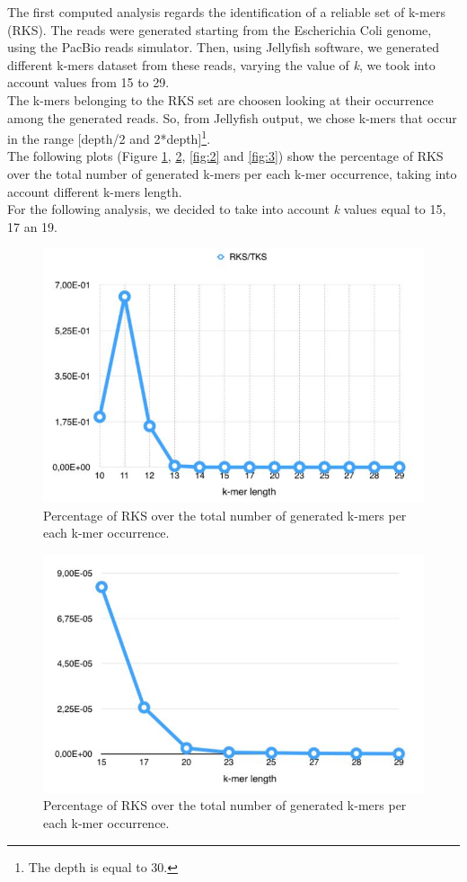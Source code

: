 \documentclass[11pt]{article}
\begin{document}
The first computed analysis regards the identification of a reliable set of k-mers (RKS).
The reads were generated starting from the Escherichia Coli genome, using the PacBio reads simulator.
Then, using Jellyfish software, we generated different k-mers dataset from these reads, varying the value of \emph{k}, we took into account values from 15 to 29.\\
The k-mers belonging to the RKS set are choosen looking at their occurrence among the generated reads. 
So, from Jellyfish output, we chose k-mers that occur in the range [depth/2 and 2*depth]\footnote{The depth is equal to 30.}.\\
The following plots (Figure \ref{fig:0}, \ref{fig:1}, \ref{fig:2} and \ref{fig:3}) show the percentage of RKS over the total number of generated k-mers per each k-mer occurrence, taking into account different k-mers length.\\
For the following analysis, we decided to take into account \emph{k} values equal to 15, 17 an 19.
\begin{figure}
    \centering
    \includegraphics[scale=0.60]{image/0}
    \caption{Percentage of RKS over the total number of generated k-mers per each k-mer occurrence.}
    \label{fig:0}
\end{figure}
\begin{figure}
    \centering
    \includegraphics[scale=0.60]{image/1}
    \caption{Percentage of RKS over the total number of generated k-mers per each k-mer occurrence.}
    \label{fig:1}
\end{figure}
\end{document}
